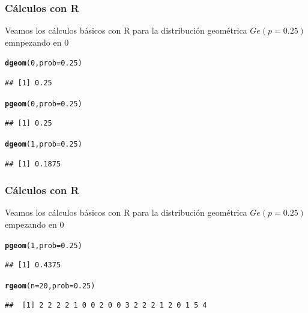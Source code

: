 \documentclass[handout]{beamer}\usepackage[]{graphicx}\usepackage[]{color}
\makeatletter
\newcommand{\hlnum}[1]{\textcolor[rgb]{0.686,0.059,0.569}{#1}}%
\newcommand{\hlstd}[1]{\textcolor[rgb]{0.345,0.345,0.345}{#1}}%
\newcommand{\hlkwc}[1]{\textcolor[rgb]{0.333,0.667,0.333}{#1}}%
\newcommand{\hlkwd}[1]{\textcolor[rgb]{0.737,0.353,0.396}{\textbf{#1}}}%
\newenvironment{kframe}{%
 \def\at@end@of@kframe{}%
 \ifinner\ifhmode%
  \def\at@end@of@kframe{\end{minipage}}%
  \begin{minipage}{\columnwidth}%
 \fi\fi%
 \def\FrameCommand##1{\hskip\@totalleftmargin \hskip-\fboxsep
 \colorbox{shadecolor}{##1}\hskip-\fboxsep
     \hskip-\linewidth \hskip-\@totalleftmargin \hskip\columnwidth}%
 \MakeFramed {\advance\hsize-\width
   \@totalleftmargin\z@ \linewidth\hsize
   \@setminipage}}%
 {\par\unskip\endMakeFramed%
 \at@end@of@kframe}
\newenvironment{knitrout}{}{} %
\theoremstyle{plain}
\theoremstyle{definition}
\makeatother
\begin{document}
\begin{frame}[fragile]
\frametitle{Cálculos con R}
Veamos los cálculos básicos con  R para la distribución geométrica  $Ge(p=0.25)$ emnpezando en $0$

\begin{knitrout}
\color{fgcolor}\begin{kframe}
\begin{alltt}
\hlkwd{dgeom}\hlstd{(}\hlnum{0}\hlstd{,}\hlkwc{prob}\hlstd{=}\hlnum{0.25}\hlstd{)}
\end{alltt}
\begin{verbatim}
## [1] 0.25
\end{verbatim}
\begin{alltt}
\hlkwd{pgeom}\hlstd{(}\hlnum{0}\hlstd{,}\hlkwc{prob}\hlstd{=}\hlnum{0.25}\hlstd{)}
\end{alltt}
\begin{verbatim}
## [1] 0.25
\end{verbatim}
\begin{alltt}
\hlkwd{dgeom}\hlstd{(}\hlnum{1}\hlstd{,}\hlkwc{prob}\hlstd{=}\hlnum{0.25}\hlstd{)}
\end{alltt}
\begin{verbatim}
## [1] 0.1875
\end{verbatim}
\end{kframe}
\end{knitrout}

\end{frame}

\begin{frame}[fragile]
\frametitle{Cálculos con R}
Veamos los cálculos básicos con  R para la distribución geométrica  $Ge(p=0.25)$ empezando en $0$

\begin{knitrout}
\color{fgcolor}\begin{kframe}
\begin{alltt}
\hlkwd{pgeom}\hlstd{(}\hlnum{1}\hlstd{,}\hlkwc{prob}\hlstd{=}\hlnum{0.25}\hlstd{)}
\end{alltt}
\begin{verbatim}
## [1] 0.4375
\end{verbatim}
\begin{alltt}
\hlkwd{rgeom}\hlstd{(}\hlkwc{n}\hlstd{=}\hlnum{20}\hlstd{,}\hlkwc{prob}\hlstd{=}\hlnum{0.25}\hlstd{)}
\end{alltt}
\begin{verbatim}
##  [1] 2 2 2 2 1 0 0 2 0 0 3 2 2 2 1 2 0 1 5 4
\end{verbatim}
\end{kframe}
\end{knitrout}

\end{frame}
\end{document}
